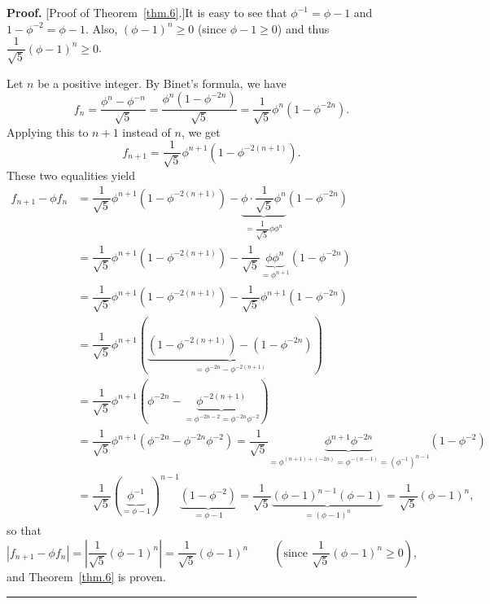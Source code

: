 \documentclass[numbers=enddot,12pt,final,onecolumn,notitlepage]{scrartcl}%
\numberwithin{exer}{section}
\theoremstyle{definition}
\newenvironment{proof}[1][Proof]{\noindent\textbf{#1.} }{\ \rule{0.5em}{0.5em}}
\begin{document}
\begin{proof}
[Proof of Theorem~\ref{thm.6}.]It is easy to see that $\phi^{-1}=\phi-1$ and
$1-\phi^{-2}=\phi-1$. Also, $\left(  \phi-1\right)  ^{n} \geq0$ (since $\phi-1
\geq0$) and thus $\dfrac{1}{\sqrt{5}} \left(  \phi-1\right)  ^{n} \geq0$.

Let $n$ be a positive integer. By Binet's formula, we have%
\[
f_{n}=\dfrac{\phi^{n}-\phi^{-n}}{\sqrt{5}}=\dfrac{\phi^{n}\left(  1-\phi
^{-2n}\right)  }{\sqrt{5}}=\dfrac{1}{\sqrt{5}}\phi^{n}\left(  1-\phi
^{-2n}\right)  .
\]
Applying this to $n+1$ instead of $n$, we get%
\[
f_{n+1}=\dfrac{1}{\sqrt{5}}\phi^{n+1}\left(  1-\phi^{-2\left(  n+1\right)
}\right)  .
\]
These two equalities yield%
\begin{align*}
f_{n+1}-\phi f_{n} &  =\dfrac{1}{\sqrt{5}}\phi^{n+1}\left(  1-\phi^{-2\left(
n+1\right)  }\right)  -\underbrace{\phi\cdot\dfrac{1}{\sqrt{5}}\phi^{n}%
}_{=\dfrac{1}{\sqrt{5}}\phi\phi^{n}}\left(  1-\phi^{-2n}\right)  \\
&  =\dfrac{1}{\sqrt{5}}\phi^{n+1}\left(  1-\phi^{-2\left(  n+1\right)
}\right)  -\dfrac{1}{\sqrt{5}}\underbrace{\phi\phi^{n}}_{=\phi^{n+1}}\left(
1-\phi^{-2n}\right)  \\
&  =\dfrac{1}{\sqrt{5}}\phi^{n+1}\left(  1-\phi^{-2\left(  n+1\right)
}\right)  -\dfrac{1}{\sqrt{5}}\phi^{n+1}\left(  1-\phi^{-2n}\right)  \\
&  =\dfrac{1}{\sqrt{5}}\phi^{n+1}\left(  \underbrace{\left(  1-\phi^{-2\left(
n+1\right)  }\right)  -\left(  1-\phi^{-2n}\right)  }_{=\phi^{-2n}%
-\phi^{-2\left(  n+1\right)  }}\right)  \\
&  =\dfrac{1}{\sqrt{5}}\phi^{n+1}\left(  \phi^{-2n}-\underbrace{\phi
^{-2\left(  n+1\right)  }}_{=\phi^{-2n-2}=\phi^{-2n}\phi^{-2}}\right)  \\
&  =\dfrac{1}{\sqrt{5}}\phi^{n+1}\left(  \phi^{-2n}-\phi^{-2n}\phi
^{-2}\right)  =\dfrac{1}{\sqrt{5}}\underbrace{\phi^{n+1}\phi^{-2n}}%
_{=\phi^{\left(  n+1\right)  +\left(  -2n\right)  }=\phi^{-\left(  n-1\right)
}=\left(  \phi^{-1}\right)  ^{n-1}}\left(  1-\phi^{-2}\right)  \\
&  =\dfrac{1}{\sqrt{5}}\left(  \underbrace{\phi^{-1}}_{=\phi-1}\right)
^{n-1}\underbrace{\left(  1-\phi^{-2}\right)  }_{=\phi-1}=\dfrac{1}{\sqrt{5}%
}\underbrace{\left(  \phi-1\right)  ^{n-1}\left(  \phi-1\right)  }_{=\left(
\phi-1\right)  ^{n}}=\dfrac{1}{\sqrt{5}}\left(  \phi-1\right)  ^{n},
\end{align*}
so that%
\[
\left\vert f_{n+1}-\phi f_{n}\right\vert =\left\vert \dfrac{1}{\sqrt{5}%
}\left(  \phi-1\right)  ^{n}\right\vert =\dfrac{1}{\sqrt{5}}\left(
\phi-1\right)  ^{n}\ \ \ \ \ \ \ \ \ \ \left(  \text{since }\dfrac{1}{\sqrt
{5}}\left(  \phi-1\right)  ^{n}\geq0\right)  ,
\]
and Theorem~\ref{thm.6} is proven.
\end{proof}
\end{document}

